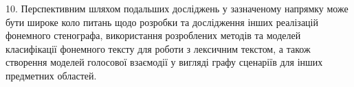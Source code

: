 10. Перспективним шляхом подальших досліджень у зазначеному напрямку може бути широке коло питань щодо розробки та дослідження інших реалізацій фонемного стенографа, використання розроблених методів та моделей класифікації фонемного тексту для роботи з лексичним текстом, а також створення моделей голосової взаємодії у вигляді графу сценаріїв для інших предметних областей.





